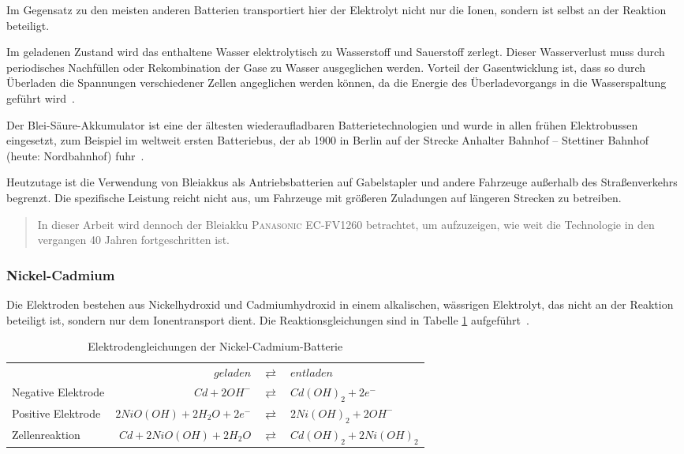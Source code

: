 Im Gegensatz zu den meisten anderen Batterien transportiert hier der Elektrolyt nicht nur die Ionen, sondern ist selbst an der Reaktion beteiligt.

Im geladenen Zustand wird das enthaltene Wasser elektrolytisch zu Wasserstoff und Sauerstoff zerlegt. Dieser Wasserverlust muss durch periodisches Nachfüllen oder Rekombination der Gase zu Wasser ausgeglichen werden. Vorteil der Gasentwicklung ist, dass so durch Überladen die Spannungen verschiedener Zellen angeglichen werden können, da die Energie des Überladevorgangs in die Wasserspaltung geführt wird~\cite[S. 182]{tub_aleph001746639}.

Der Blei-Säure-Akkumulator ist eine der ältesten wiederaufladbaren Batterietechnologien und wurde in allen frühen Elektrobussen eingesetzt, zum Beispiel im weltweit ersten Batteriebus, der ab 1900 in Berlin auf der Strecke Anhalter Bahnhof – Stettiner Bahnhof (heute: Nordbahnhof) fuhr~\cite[S. 8f]{Risch:1957}.

Heutzutage ist die Verwendung von Bleiakkus als Antriebsbatterien auf Gabelstapler und andere Fahrzeuge außerhalb des Straßenverkehrs begrenzt. Die spezifische Leistung reicht nicht aus, um Fahrzeuge mit größeren Zuladungen auf längeren Strecken zu betreiben.

\begin{quote}
	In dieser Arbeit wird dennoch der Bleiakku \textsc{Panasonic EC-FV1260} betrachtet, um aufzuzeigen, wie weit die Technologie in den vergangen 40 Jahren fortgeschritten ist.
\end{quote}



\subsubsection{Nickel-Cadmium}
Die Elektroden bestehen aus Nickelhydroxid und Cadmiumhydroxid in einem alkalischen, wässrigen Elektrolyt, das nicht an der Reaktion beteiligt ist, sondern nur dem Ionentransport dient. Die Reaktionsgleichungen sind in Tabelle \ref{NiCd} aufgeführt~\cite[S.233]{Sterner:2014}.

\begin{table}\centering
	\begin{tabularx}{\linewidth}{XrcX}
		\toprule
		&               $geladen$ & $\rightleftarrows$ & $entladen$             \\
		Negative Elektrode &            $Cd + 2OH^-$ & $\rightleftarrows$ & $Cd(OH)_2 + 2e^-$      \\
		Positive Elektrode & $2NiO(OH) + 2H_2O + 2e^-$ & $\rightleftarrows$ & $2Ni(OH)_2 + 2OH^-$    \\ \midrule
		Zellenreaktion     &   $Cd + 2NiO(OH) + 2H_2O$ & $\rightleftarrows$ & $Cd(OH)_2 + 2Ni(OH)_2$ \\ \bottomrule
	\end{tabularx}
	\caption{Elektrodengleichungen der Nickel-Cadmium-Batterie}
	\label{NiCd}
\end{table}

